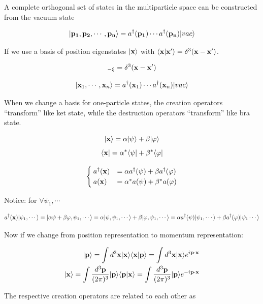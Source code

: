 A complete orthogonal set of states in the multiparticle space can be constructed from the vacuum state 

\[|{\bf p_1},{\bf p_2},\cdots,{\bf p_n}\rangle = a^\dagger({\bf p_1})\cdots a^\dagger({\bf p_n})|vac\rangle \]

If we use a basis of position eigenstates $|\bf{x}\rangle$ with $\langle {\bf x}|{\bf x'}\rangle = \delta^3({\bf x} - {\bf x'})$.

\begin{align}
[a({\bf x}),a^\dagger({\bf x'})]_{-\xi} = \delta^3({\bf x} - {\bf x'})
\end{align}

\[|{\bf x}_1,\cdots,{\bf x}_n\rangle = a^\dagger({\bf x}_1)\cdots a^\dagger({\bf x}_n)|vac\rangle \]

When we change a basis for one-particle states, the creation operators ``transform'' like ket state, while the destruction operators ``transform'' like bra state. 

\[|{\bf x}\rangle = \alpha|\psi\rangle + \beta|\varphi\rangle \]
\[\langle{\bf x}| = \alpha^*\langle\psi| + \beta^*\langle\varphi| \]

\[\begin{cases}
a^\dagger({\bf x}) &= \alpha a^\dagger(\psi)+\beta a^\dagger(\varphi)\\
a({\bf x}) &= \alpha^* a(\psi) + \beta^* a(\varphi)
\end{cases}\]

Notice: for $\forall \psi_1,\cdots$

\[a^\dagger({\bf x})|\psi_1,\cdots\rangle = |\alpha\psi+\beta\varphi,\psi_1,\cdots\rangle = \alpha|\psi,\psi_1,\cdots\rangle + \beta|\varphi,\psi_1,\cdots\rangle = \alpha a^\dagger(\psi)|\psi_1,\cdots\rangle + \beta a^\dagger(\varphi)|\psi_1\cdots\rangle \]

Now if we change from position representation to momentum representation:

\[\begin{split}
|{\bf p}\rangle = \int d^3{\bf x} |{\bf x}\rangle\langle{\bf x}|{\bf p}\rangle = \int d^3{\bf x}|{\bf x}\rangle e^{i{\bf p}\cdot{\bf x}}\\
|{\bf x}\rangle = \int\frac{d^3{\bf p}}{(2\pi)^3} |{\bf p}\rangle\langle{\bf p}|{\bf x}\rangle = \int\frac{d^3{\bf p}}{(2\pi)^3}|{\bf p}\rangle e^{-i{\bf p}\cdot{\bf x}}
\end{split}\]

The respective creation operators are related to each other as 

